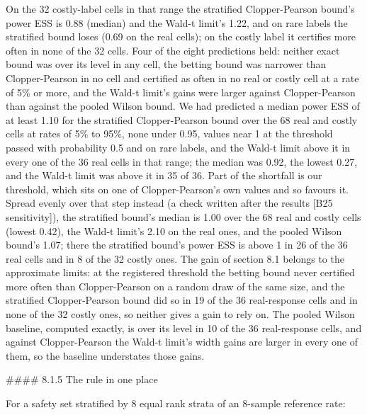 \documentclass[11pt]{article}
\begin{document}
On the 32 costly-label cells in that range the stratified Clopper-Pearson bound's power ESS is 0.88 (median) and the Wald-t limit's 1.22, and on rare labels the stratified bound loses (0.69 on the real cells); on the costly label it certifies more often in none of the 32 cells. Four of the eight predictions held: neither exact bound was over its level in any cell, the betting bound was narrower than Clopper-Pearson in no cell and certified as often in no real or costly cell at a rate of 5\% or more, and the Wald-t limit's gains were larger against Clopper-Pearson than against the pooled Wilson bound. We had predicted a median power ESS of at least 1.10 for the stratified Clopper-Pearson bound over the 68 real and costly cells at rates of 5\% to 95\%, none under 0.95, values near 1 at the threshold passed with probability 0.5 and on rare labels, and the Wald-t limit above it in every one of the 36 real cells in that range; the median was 0.92, the lowest 0.27, and the Wald-t limit was above it in 35 of 36. Part of the shortfall is our threshold, which sits on one of Clopper-Pearson's own values and so favours it. Spread evenly over that step instead (a check written after the results [B25 sensitivity]), the stratified bound's median is 1.00 over the 68 real and costly cells (lowest 0.42), the Wald-t limit's 2.10 on the real ones, and the pooled Wilson bound's 1.07; there the stratified bound's power ESS is above 1 in 26 of the 36 real cells and in 8 of the 32 costly ones. The gain of section 8.1 belongs to the approximate limits: at the registered threshold the betting bound never certified more often than Clopper-Pearson on a random draw of the same size, and the stratified Clopper-Pearson bound did so in 19 of the 36 real-response cells and in none of the 32 costly ones, so neither gives a gain to rely on. The pooled Wilson baseline, computed exactly, is over its level in 10 of the 36 real-response cells, and against Clopper-Pearson the Wald-t limit's width gains are larger in every one of them, so the baseline understates those gains.


\#\#\#\# 8.1.5 The rule in one place


For a safety set stratified by 8 equal rank strata of an 8-sample reference rate:
\end{document}
